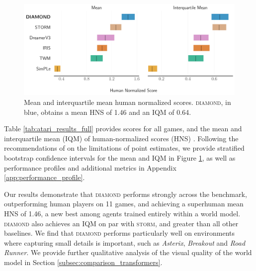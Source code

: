 \begin{figure}
\vspace{-15mm}
\begin{center}
\centerline{\includegraphics[width=\linewidth]{images/aggregates.pdf}}
\caption{Mean and interquartile mean human normalized scores. \textsc{diamond}, in blue, obtains a mean HNS of 1.46 and an IQM of 0.64.}
\label{fig:results_mean_IQM}
\end{center}
\vskip -15mm
\end{figure}


Table \ref{tab:atari_results_full} provides scores for all games, and the mean and interquartile mean (IQM) of human-normalized scores (HNS) \citep{dueling_networks}. Following the recommendations of \citet{agarwal2021deep} on the limitations of point estimates, we provide stratified bootstrap confidence intervals for the mean and IQM in Figure \ref{fig:results_mean_IQM}, as well as performance profiles and additional metrics in Appendix \ref{app:performance_profile}.

Our results demonstrate that \textsc{diamond} performs strongly across the benchmark, outperforming human players on 11 games, and achieving a superhuman mean HNS of 1.46, a new best among agents trained entirely within a world model. \textsc{diamond} also achieves an IQM on par with \textsc{storm}, and greater than all other baselines. We find that \textsc{diamond} performs particularly well on environments where capturing small details is important, such as \textit{Asterix}, \textit{Breakout} and \textit{Road Runner}. We provide further qualitative analysis of the visual quality of the world model in Section \ref{subsec:comparison_transformers}. 
